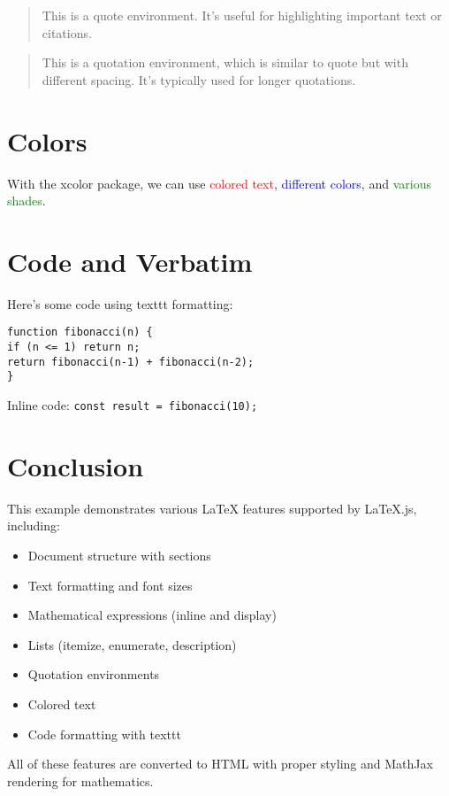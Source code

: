 \documentclass{article}
\begin{document}
\begin{quote}
This is a quote environment. It's useful for highlighting important text or citations.
\end{quote}

\begin{quotation}
This is a quotation environment, which is similar to quote but with different spacing.
It's typically used for longer quotations.
\end{quotation}

\section{Colors}

With the xcolor package, we can use \textcolor{red}{colored text}, 
\textcolor{blue}{different colors}, and \textcolor{green}{various shades}.

\section{Code and Verbatim}

Here's some code using texttt formatting:

\texttt{function fibonacci(n) \{\\
\hspace{1em}if (n <= 1) return n;\\
\hspace{1em}return fibonacci(n-1) + fibonacci(n-2);\\
\}}

Inline code: \texttt{const result = fibonacci(10);}

\section{Conclusion}

This example demonstrates various LaTeX features supported by LaTeX.js, including:
\begin{itemize}
\item Document structure with sections
\item Text formatting and font sizes  
\item Mathematical expressions (inline and display)
\item Lists (itemize, enumerate, description)
\item Quotation environments
\item Colored text
\item Code formatting with texttt
\end{itemize}

All of these features are converted to HTML with proper styling and MathJax rendering for mathematics.
\end{document}
